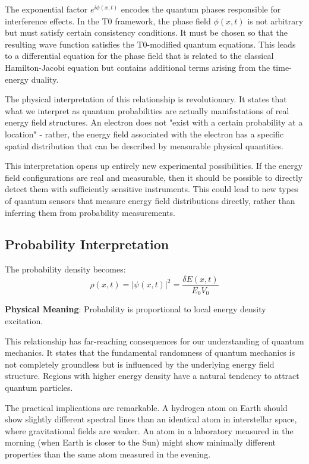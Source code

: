 \documentclass[12pt,a4paper]{article}
\newcommand{\deltaE}{\delta E}
\theoremstyle{definition}
\theoremstyle{remark}
\begin{document}
The exponential factor $e^{i\phi(x,t)}$ encodes the quantum phases responsible for interference effects. In the T0 framework, the phase field $\phi(x,t)$ is not arbitrary but must satisfy certain consistency conditions. It must be chosen so that the resulting wave function satisfies the T0-modified quantum equations. This leads to a differential equation for the phase field that is related to the classical Hamilton-Jacobi equation but contains additional terms arising from the time-energy duality.

The physical interpretation of this relationship is revolutionary. It states that what we interpret as quantum probabilities are actually manifestations of real energy field structures. An electron does not "exist with a certain probability at a location" - rather, the energy field associated with the electron has a specific spatial distribution that can be described by measurable physical quantities.

This interpretation opens up entirely new experimental possibilities. If the energy field configurations are real and measurable, then it should be possible to directly detect them with sufficiently sensitive instruments. This could lead to new types of quantum sensors that measure energy field distributions directly, rather than inferring them from probability measurements.

\subsection{Probability Interpretation}

The probability density becomes:
\begin{equation}
	\rho(x,t) = |\psi(x,t)|^2 = \frac{\deltaE(x,t)}{E_0 V_0}
	\label{eq:probability_density}
\end{equation}

\textbf{Physical Meaning}: Probability is proportional to local energy density excitation.

This relationship has far-reaching consequences for our understanding of quantum mechanics. It states that the fundamental randomness of quantum mechanics is not completely groundless but is influenced by the underlying energy field structure. Regions with higher energy density have a natural tendency to attract quantum particles.

The practical implications are remarkable. A hydrogen atom on Earth should show slightly different spectral lines than an identical atom in interstellar space, where gravitational fields are weaker. An atom in a laboratory measured in the morning (when Earth is closer to the Sun) might show minimally different properties than the same atom measured in the evening.
\end{document}
